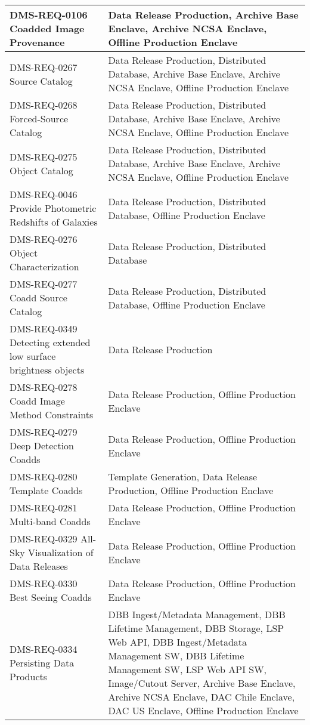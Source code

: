 \begin{xtabular}{p{0.4\textwidth}p{0.55\textwidth}}
DMS-REQ-0106 Coadded Image Provenance & Data Release Production, Archive Base Enclave, Archive NCSA Enclave, Offline Production Enclave \\ \hline
DMS-REQ-0267 Source Catalog & Data Release Production, Distributed Database, Archive Base Enclave, Archive NCSA Enclave, Offline Production Enclave \\ \hline
DMS-REQ-0268 Forced-Source Catalog & Data Release Production, Distributed Database, Archive Base Enclave, Archive NCSA Enclave, Offline Production Enclave \\ \hline
DMS-REQ-0275 Object Catalog & Data Release Production, Distributed Database, Archive Base Enclave, Archive NCSA Enclave, Offline Production Enclave \\ \hline
DMS-REQ-0046 Provide Photometric Redshifts of Galaxies & Data Release Production, Distributed Database, Offline Production Enclave \\ \hline
DMS-REQ-0276 Object Characterization & Data Release Production, Distributed Database \\ \hline
DMS-REQ-0277 Coadd Source Catalog & Data Release Production, Distributed Database, Offline Production Enclave \\ \hline
DMS-REQ-0349 Detecting extended  low surface brightness objects & Data Release Production \\ \hline
DMS-REQ-0278 Coadd Image Method Constraints & Data Release Production, Offline Production Enclave \\ \hline
DMS-REQ-0279 Deep Detection Coadds & Data Release Production, Offline Production Enclave \\ \hline
DMS-REQ-0280 Template Coadds & Template Generation, Data Release Production, Offline Production Enclave \\ \hline
DMS-REQ-0281 Multi-band Coadds & Data Release Production, Offline Production Enclave \\ \hline
DMS-REQ-0329 All-Sky Visualization of Data Releases & Data Release Production, Offline Production Enclave \\ \hline
DMS-REQ-0330 Best Seeing Coadds & Data Release Production, Offline Production Enclave \\ \hline
DMS-REQ-0334 Persisting Data Products & DBB Ingest/Metadata Management, DBB Lifetime Management, DBB Storage, LSP Web API, DBB Ingest/Metadata Management SW, DBB Lifetime Management SW, LSP Web API SW, Image/Cutout Server, Archive Base Enclave, Archive NCSA Enclave, DAC Chile Enclave, DAC US Enclave, Offline Production Enclave \\ \hline

\end{xtabular}
